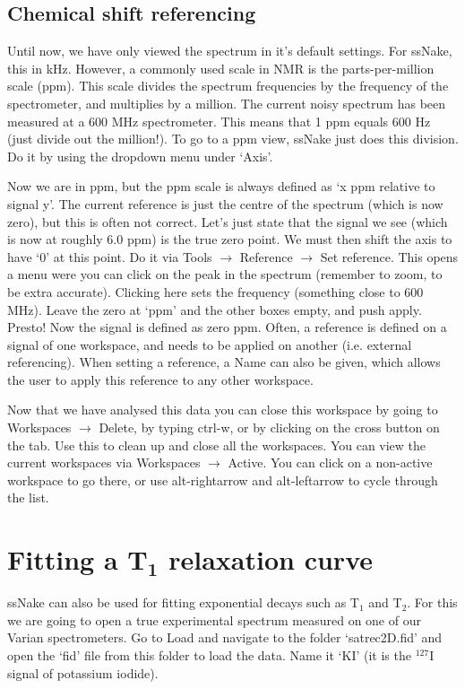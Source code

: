 \documentclass[11pt,a4paper]{article}
\begin{document}
\subsection{Chemical shift referencing}
Until now, we have only viewed the spectrum in it's default settings. For ssNake, this in kHz.
However, a commonly used scale in NMR is the parts-per-million scale (ppm). This scale divides the
spectrum frequencies by the frequency of the spectrometer, and multiplies by a million. The current
noisy spectrum has been measured at a 600 MHz spectrometer. This means that 1 ppm equals 600 Hz
(just divide out the million!). To go to a ppm view, ssNake just does this division. Do it by using
the dropdown menu under `Axis'.

Now we are in ppm, but the ppm scale is always defined as `x ppm relative to signal y'. The current
reference is just the centre of the spectrum (which is now zero), but this is often not correct.
Let's just state that the signal we see (which is now at roughly 6.0 ppm) is the true zero point. We
must then shift the axis to have `0' at this point. Do it via Tools $\rightarrow$ Reference
$\rightarrow$ Set reference. This opens a menu were you can click on the peak in the spectrum
(remember to zoom, to be extra accurate). Clicking here sets the frequency (something close to 600
MHz). Leave the zero at `ppm' and the other boxes empty, and push apply. Presto! Now the signal is
defined as zero ppm. Often, a reference is defined on a signal of one workspace, and needs to be
applied on another (i.e. external referencing). When setting a reference, a Name can also be given,
which allows the user to apply this reference to any other workspace.

Now that we have analysed this data you can close this workspace by going to Workspaces
$\rightarrow$ Delete, by typing ctrl-w, or by clicking on the cross button on the tab. Use this to
clean up and close all the workspaces. You can view the current workspaces via Workspaces
$\rightarrow$ Active. You can click on a non-active workspace to go there, or use alt-rightarrow and
alt-leftarrow to cycle through the list.

\section{Fitting a T$_{\textbf{1}}$ relaxation curve}
ssNake can also be used for fitting exponential decays such as T$_1$ and T$_2$.
For this we are going to open a true experimental spectrum measured on one of
our Varian spectrometers. Go to Load and navigate to the folder `satrec2D.fid'
and open the `fid' file from this folder to load the data. Name it `KI' (it is
the $^{127}$I signal of potassium iodide).
\end{document}
